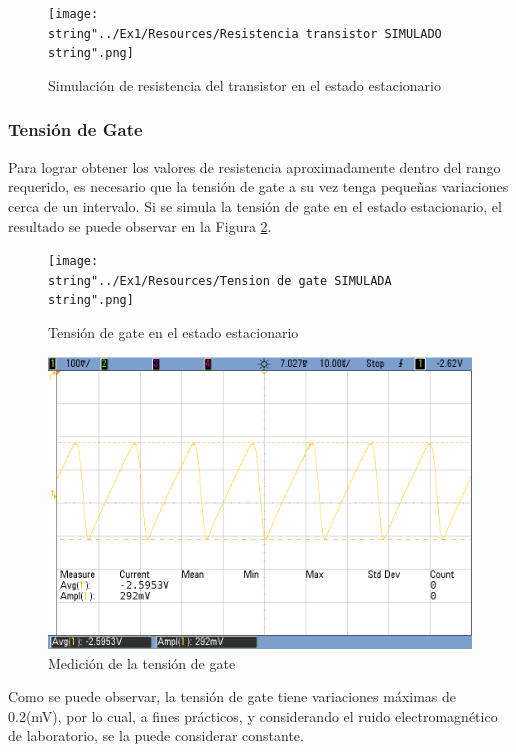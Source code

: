 \begin{figure}[h]
\begin{centering}
\texttt{[image: \\string"../Ex1/Resources/Resistencia transistor SIMULADO\\string".png]}
\par\end{centering}
\caption{Simulación de resistencia del transistor en el estado estacionario}
\label{1_14}

\end{figure}

\subsubsection{Tensión de Gate}

Para lograr obtener los valores de resistencia aproximadamente dentro
del rango requerido, es necesario que la tensión de gate a su vez
tenga pequeñas variaciones cerca de un intervalo. Si se simula la
tensión de gate en el estado estacionario, el resultado se puede observar
en la Figura \ref{1_15}.

\begin{figure}[h]
\begin{centering}
\texttt{[image: \\string"../Ex1/Resources/Tension de gate SIMULADA\\string".png]}
\par\end{centering}
\caption{Tensión de gate en el estado estacionario}

\label{1_15}
\end{figure}

\begin{figure}[h]
\begin{centering}
\includegraphics[scale=0.35]{../Ex1/Resources/VG}
\par\end{centering}
\caption{Medición de la tensión de gate}

\end{figure}

Como se puede observar, la tensión de gate tiene variaciones máximas
de 0.2(mV), por lo cual, a fines prácticos, y considerando el ruido
electromagnético de laboratorio, se la puede considerar constante.
